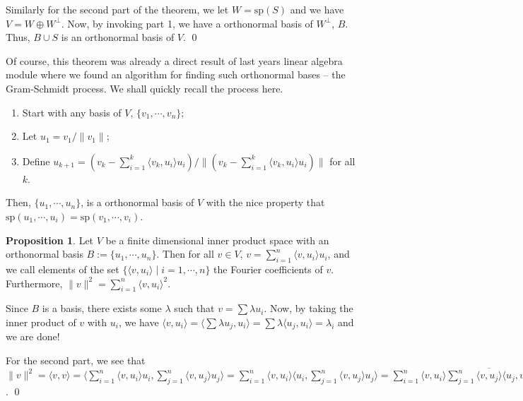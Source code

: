 \documentclass[
]{article}
\theoremstyle{definition}
\newtheorem{prop}{Proposition}[section]
\theoremstyle{definition}
\begin{document}
Similarly for the second part of the theorem, we let
\(W = \text{sp}(S)\) and we have \(V = W \oplus W^\bot\). Now, by
invoking part 1, we have a orthonormal basis of \(W^\bot\), \(B\). Thus,
\(B \cup S\) is an orthonormal basis of \(V\). \qed

Of course, this theorem was already a direct result of last years linear
algebra module where we found an algorithm for finding such orthonormal
bases -- the Gram-Schmidt process. We shall quickly recall the process
here.

\begin{enumerate}
  \item Start with any basis of \(V\), \(\{v_1, \cdots, v_n\}\);
  \item Let \(u_1 = v_1 / \|v_1\|\);
  \item Define \(u_{k + 1} = (v_k - \sum_{i = 1}^k \langle v_k, u_i \rangle u_i) / 
    \| (v_k - \sum_{i = 1}^k \langle v_k, u_i \rangle u_i) \|\) for all \(k\).
\end{enumerate}

Then, \(\{u_1, \cdots, u_n\}\), is a orthonormal basis of \(V\) with the
nice property that
\(\text{sp}(u_1, \cdots, u_i) = \text{sp}(v_1, \cdots, v_i)\).

\begin{prop}
  Let \(V\) be a finite dimensional inner product space with an orthonormal 
  basis \(B := \{u_1, \cdots, u_n\}\). Then for all \(v \in V\), 
  \(v = \sum_{i = 1}^n \langle v, u_i \rangle u_i\), and we call elements of the set 
  \(\{\langle v, u_i \rangle \mid i = 1, \cdots, n\}\) the Fourier coefficients 
  of \(v\). Furthermore, \(\| v \|^2 = \sum_{i = 1}^n \langle v, u_i \rangle^2\).
\end{prop}
\proof

Since \(B\) is a basis, there exists some \(\lambda\) such that
\(v = \sum \lambda u_i\). Now, by taking the inner product of \(v\) with
\(u_i\), we have
\(\langle v, u_i \rangle = \langle \sum \lambda u_j, u_i \rangle  = \sum \lambda \langle u_j, u_i \rangle = \lambda_i\)
and we are done!

For the second part, we see that
\(\| v \|^2 = \langle v, v \rangle  = \langle \sum_{i = 1}^n \langle v, u_i \rangle u_i,  \sum_{j = 1}^n \langle v, u_j \rangle u_j \rangle  = \sum_{i = 1}^n \langle v, u_i \rangle \langle u_i,  \sum_{j = 1}^n \langle v, u_j \rangle u_j \rangle  = \sum_{i = 1}^n \langle v, u_i \rangle \overline{  \sum_{j = 1}^n \langle v, u_j \rangle \langle u_j, u_i \rangle}  = \sum_{i = 1}^n \langle v, u_i \rangle \overline{\langle v, u_i \rangle}  = \sum_{i = 1}^n \langle v, u_i \rangle^2\).
\qed
\end{document}
